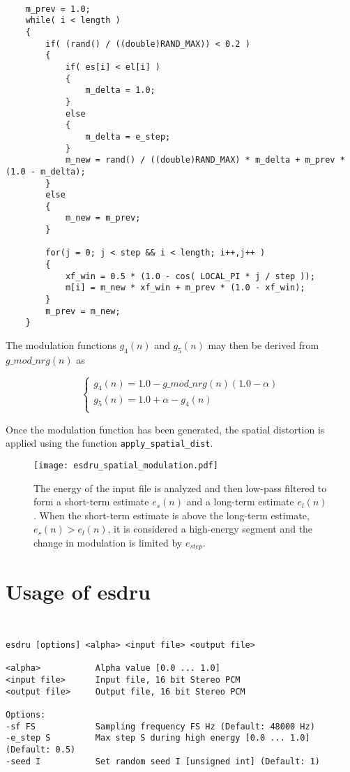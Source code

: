 {\tt\small
\begin{verbatim}
    m_prev = 1.0;
    while( i < length )    
    {
        if( (rand() / ((double)RAND_MAX)) < 0.2 )
        { 
            if( es[i] < el[i] )
            {
                m_delta = 1.0;
            }
            else
            {
                m_delta = e_step;
            }
            m_new = rand() / ((double)RAND_MAX) * m_delta + m_prev * (1.0 - m_delta);
        }
        else
        {
            m_new = m_prev;
        }

        for(j = 0; j < step && i < length; i++,j++ )
        {
            xf_win = 0.5 * (1.0 - cos( LOCAL_PI * j / step ));
            m[i] = m_new * xf_win + m_prev * (1.0 - xf_win);
        }
        m_prev = m_new;
    }
\end{verbatim}
}    
    
The modulation functions $g_4(n)$ and $g_5(n)$ may then be derived from $g\_mod\_nrg(n)$ as 

  \[
    \left\{
       \begin{array}{ll}
            g_4(n) = 1.0 - g\_mod\_nrg(n) (1.0 - \alpha) \\
            g_5(n) = 1.0 + \alpha - g_4(n)               \\
       \end{array}
     \right.
  \]
  
Once the modulation function has been generated, the spatial distortion is applied using the 
function \texttt{apply\_spatial\_dist}.


\begin{figure}[htp]
    \begin{center}
        \texttt{[image: esdru\_spatial\_modulation.pdf]}
  \end{center}
  \caption{The energy of the input file is analyzed and then low-pass filtered to form a 
           short-term estimate $e_s(n)$ and a long-term estimate $e_l(n)$. When the short-term  
           estimate is above the long-term estimate, $e_s(n)>e_l(n)$, it is considered a high-energy
           segment and the change in modulation is limited by $e_{step}$.
           \label{fig:esdru_spatial_modulation} }
\end{figure}



\section{Usage of esdru}

{\tt\small
\begin{verbatim}
esdru [options] <alpha> <input file> <output file>

<alpha>           Alpha value [0.0 ... 1.0]
<input file>      Input file, 16 bit Stereo PCM
<output file>     Output file, 16 bit Stereo PCM

Options:
-sf FS            Sampling frequency FS Hz (Default: 48000 Hz)
-e_step S         Max step S during high energy [0.0 ... 1.0] (Default: 0.5)
-seed I           Set random seed I [unsigned int] (Default: 1)
\end{verbatim}
}
